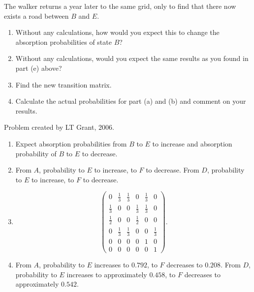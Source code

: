 \documentclass[12pt]{article}
\begin{document}
\begin{exercise}
    The walker returns a year later to the same grid, only to find that
    there now exists a road between \( B \) and \( E \).
    \begin{enumerate}[label=(\alph*)]
    \item
        Without any calculations, how would you expect this to change
        the absorption probabilities of state \( B \)?
    \item
        Without any calculations, would you expect the same results as
        you found in part (e) above?
    \item
        Find the new transition matrix.
    \item
        Calculate the actual probabilities for part (a) and (b) and
        comment on your results.
    \end{enumerate}
\end{exercise}
\begin{solution}
    Problem created by LT Grant, 2006.
    \begin{enumerate}[label=(\alph*)]
    \item
        Expect absorption probabilities from \( B \) to \( E \) to
        increase and absorption probability of \( B \) to \( E \) to
        decrease.
    \item
        From \( A \), probability to \( E \) to increase, to \( F \) to
        decrease.  From \( D \), probability to \( E \) to increase, to \(
        F \) to decrease.
    \item
        \[
            \begin{pmatrix}
                0 & \frac{1}{3} & \frac{1}{3} & 0 & \frac{1}{3} & 0\\
                \frac{1}{3} & 0 & 0 & \frac{1}{3} & \frac{1}{3} & 0\\
                \frac{1}{2} & 0 & 0 & \frac{1}{2} & 0 & 0\\
                0 & \frac{1}{3} & \frac{1}{3} & 0 & 0 & \frac{1}{3}\\
                0 & 0 & 0 & 0 & 1 & 0\\
                0 & 0 & 0 & 0 & 0 & 1
            \end{pmatrix}
            .
        \]
    \item
        From \( A \), probability to \( E \) increases to \( 0.792 \),
        to \( F \) decreases to \( 0.208 \).  From \( D \), probability
        to \( E \) increases to approximately \( 0.458 \), to \( F \)
        decreases to approximately \( 0.542 \).
\end{enumerate}
\end{solution}
\end{document}

